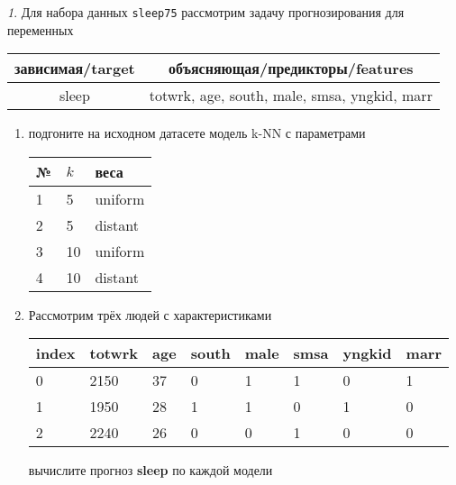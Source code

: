 \documentclass[12pt]{article}
\theoremstyle{remark}
\newtheorem{exercise}{}[section]
\begin{document}
\begin{exercise}
Для набора данных \texttt{sleep75} рассмотрим задачу прогнозирования
для переменных
\begin{center}
	\begin{tabular}{|c|c|}\hline
		зависимая/target & объясняющая/предикторы/features \\ \hline
		sleep & totwrk, age, south, male, smsa, yngkid, marr \\ \hline
	\end{tabular}
\end{center}
\begin{enumerate}
	\item подгоните на исходном датасете модель k-NN с параметрами
	\begin{center}
		\begin{tabular}{|l|l|l|}\hline
		№ & \(k\) & веса \\ \hline
		1 & 5 & uniform \\
		2 & 5 & distant \\
		3 & 10 & uniform \\
		4 & 10 & distant \\ \hline
		\end{tabular}
	\end{center}
	\item Рассмотрим трёх людей с характеристиками
	\begin{center}
		\begin{tabular}{|l||l|l|l|l|l|l|l|}\hline
			index & totwrk & age & south & male & smsa & yngkid & marr \\ \hline\hline
			0 & 2150 & 37 & 0 & 1 & 1 & 0 & 1 \\
			1 & 1950 & 28 & 1 & 1 & 0 & 1 & 0 \\
			2 & 2240 & 26 & 0 & 0 & 1 & 0 & 0 \\ \hline
		\end{tabular}
	\end{center}
	вычислите прогноз \textbf{sleep} по каждой модели
\end{enumerate}
\end{exercise}
\end{document}
